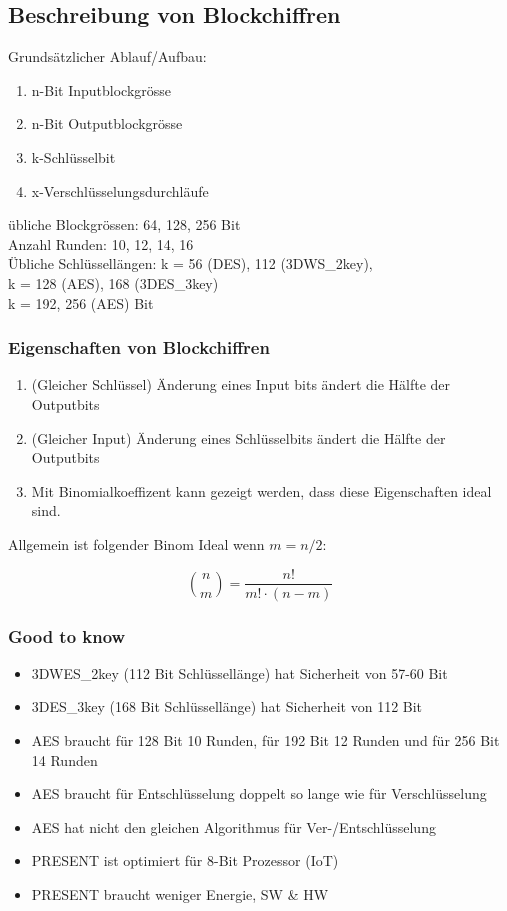 \documentclass[12pt]{scrartcl}
\begin{document}
\subsection[Blockschiffren]{Beschreibung von Blockchiffren}

Grundsätzlicher Ablauf/Aufbau:

\begin{enumerate}
    \item n-Bit Inputblockgrösse
    \item n-Bit Outputblockgrösse
    \item k-Schlüsselbit
    \item x-Verschlüsselungsdurchläufe
\end{enumerate}

übliche Blockgrössen: 64, 128, 256 Bit \\
Anzahl Runden: 10, 12, 14, 16 \\
Übliche Schlüssellängen: 
k = 56 (DES), 112 (3DWS\_2key), \\
k = 128 (AES), 168 (3DES\_3key) \\
k = 192, 256 (AES) Bit\\


\subsubsection[Blockschiffren Eig.]{Eigenschaften von Blockchiffren}

\begin{enumerate}
    \item (Gleicher Schlüssel) Änderung eines Input bits ändert die Hälfte der Outputbits
    \item (Gleicher Input) Änderung eines Schlüsselbits ändert die Hälfte der Outputbits
    \item Mit Binomialkoeffizent kann gezeigt werden, dass diese Eigenschaften ideal sind.
\end{enumerate}

Allgemein ist folgender Binom Ideal wenn $m = n/2$:

$$ \binom{n}{m} = \frac{n!}{m! \cdot (n-m)} $$


\subsubsection{Good to know}

\begin{itemize}
    \item 3DWES\_2key (112 Bit Schlüssellänge) hat Sicherheit von 57-60 Bit
    \item 3DES\_3key (168 Bit Schlüssellänge) hat Sicherheit von 112 Bit
    \item AES braucht für 128 Bit 10 Runden, für 192 Bit 12 Runden und für 256 Bit 14 Runden
    \item AES braucht für Entschlüsselung doppelt so lange wie für Verschlüsselung
    \item AES hat nicht den gleichen Algorithmus für Ver-/Entschlüsselung
    \item PRESENT ist optimiert für 8-Bit Prozessor (IoT)
    \item PRESENT braucht weniger Energie, SW \& HW
\end{itemize}
\end{document}
